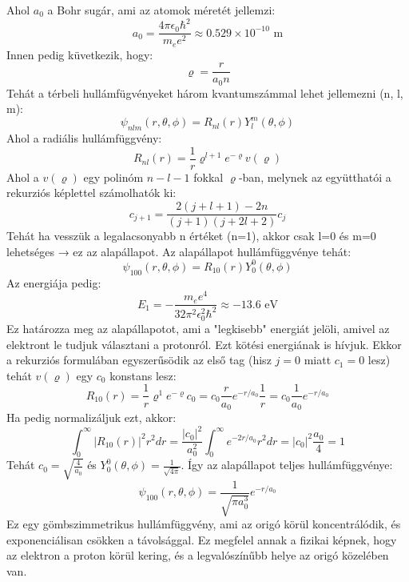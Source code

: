 \documentclass[../main.tex]{subfiles}
\begin{document}
Ahol $a_0$ a Bohr sugár, ami az atomok méretét jellemzi:
\begin{equation}
    a_0 = \frac{4 \pi \epsilon_0 \hbar^2}{m_e e^2} \approx 0.529 \times 10^{-10} \text{ m}
\end{equation}
Innen pedig küvetkezik, hogy:
\begin{equation}
    \varrho = \frac{r}{a_0 n}
\end{equation}
Tehát a térbeli hullámfügvényeket három kvantumszámmal lehet jellemezni (n, l, m):
\begin{equation}
    \psi_{n l m}(r, \theta, \phi) = R_{n l}(r) Y_{l}^m(\theta, \phi)
\end{equation}
Ahol a radiális hullámfüggvény:
\begin{equation}
    R_{n l}(r) = \frac{1}{r}\varrho^{l + 1} e^{-\varrho} v(\varrho)
\end{equation}
Ahol a $v(\varrho)$ egy polinóm $n-l-1$ fokkal $\varrho$-ban, melynek az együtthatói a rekurziós képlettel számolhatók ki:
\begin{equation}
    c_{j + 1} = \frac{2(j + l + 1) - 2n}{(j + 1)(j + 2l + 2)} c_j
\end{equation}
Tehát ha vesszük a legalacsonyabb n értéket (n=1), akkor csak l=0 és m=0 lehetséges → ez az alapállapot.
Az alapállapot hullámfüggvénye tehát:
\begin{equation}
    \psi_{100}(r, \theta, \phi) = R_{10}(r) Y_0^0(\theta, \phi)
\end{equation}
Az energiája pedig:
\begin{equation}
    E_1 = - \frac{m_e e^4}{32 \pi^2 \epsilon_0^2 \hbar^2} \approx -13.6 \text{ eV}
\end{equation}
Ez határozza meg az alapállapotot, ami a "legkisebb" energiát jelöli, amivel az elektront le tudjuk választani a protonról. Ezt kötési energiának is hívjuk.
Ekkor a rekurziós formulában egyszerűsödik az első tag (hisz $j = 0$ miatt $c_1 = 0$ lesz) tehát $v(\varrho)$ egy $c_0$ konstans lesz:
\begin{equation}
    R_ {10}(r) = \frac{1}{r} \varrho^{1} e^{-\varrho} c_0 = c_0 \frac{r}{a_0} e^{-r/a_0} \frac{1}{r} = c_0 \frac{1}{a_0} e^{-r/a_0}
\end{equation}
Ha pedig normalizáljuk ezt, akkor:
\begin{equation}
   \int_{0}^{\infty} |R_{10}(r)|^2 r^2 dr = \frac{|c_0|^2}{a_0^2} \int_{0}^{\infty} e^{-2r/a_0} r^2 dr = |c_0|^2 \frac{a_0}{4} = 1
\end{equation}
Tehát $c_0 = \sqrt{\frac{4}{a_0}}$ és $Y_0^0(\theta, \phi) = \frac{1}{\sqrt{4 \pi}}$. Így az alapállapot teljes hullámfüggvénye:
\begin{equation}
    \psi_{100}(r, \theta, \phi) = \frac{1}{\sqrt{\pi a_0^3}} e^{-r/a_0}
\end{equation}
Ez egy gömbszimmetrikus hullámfüggvény, ami az origó körül koncentrálódik, és exponenciálisan csökken a távolsággal. Ez megfelel annak a fizikai képnek, hogy az elektron a proton körül kering,
és a legvalószínűbb helye az origó közelében van.
\end{document}
